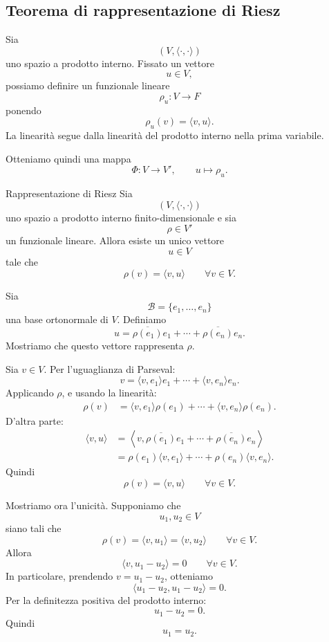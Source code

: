 \documentclass[a4paper]{article}
\begin{document}
\subsection{Teorema di rappresentazione di Riesz}

Sia
\[
    (V,\langle\cdot,\cdot\rangle)
\]
uno spazio a prodotto interno. Fissato un vettore
\[
    u\in V,
\]
possiamo definire un funzionale lineare
\[
    \rho_u:V\to F
\]
ponendo
\[
    \rho_u(v)=\langle v,u\rangle.
\]
La linearità segue dalla linearità del prodotto interno nella prima variabile.

Otteniamo quindi una mappa
\[
    \Phi:V\to V',
    \qquad
    u\mapsto \rho_u.
\]

\begin{snippettheorem}{Rappresentazione di Riesz}
    Sia
    \[
        (V,\langle\cdot,\cdot\rangle)
    \]
    uno spazio a prodotto interno finito-dimensionale e sia
    \[
        \rho\in V'
    \]
    un funzionale lineare. Allora esiste un unico vettore
    \[
        u\in V
    \]
    tale che
    \[
        \rho(v)=\langle v,u\rangle
        \qquad
        \forall v\in V.
    \]
\end{snippettheorem}

\begin{snippetproof}{}
    Sia
    \[
        \mathcal{B}=\{e_1,\ldots,e_n\}
    \]
    una base ortonormale di \(V\). Definiamo
    \[
        u=
        \overline{\rho(e_1)}e_1+\cdots+\overline{\rho(e_n)}e_n.
    \]
    Mostriamo che questo vettore rappresenta \(\rho\).

    Sia \(v\in V\). Per l'uguaglianza di Parseval:
    \[
        v=
        \langle v,e_1\rangle e_1+\cdots+\langle v,e_n\rangle e_n.
    \]
    Applicando \(\rho\), e usando la linearità:
    \begin{align*}
        \rho(v)
        &=
        \langle v,e_1\rangle\rho(e_1)
        +\cdots+
        \langle v,e_n\rangle\rho(e_n).
    \end{align*}
    D'altra parte:
    \begin{align*}
        \langle v,u\rangle
        &=
        \left\langle
        v,
        \overline{\rho(e_1)}e_1+\cdots+\overline{\rho(e_n)}e_n
        \right\rangle\\
        &=
        \rho(e_1)\langle v,e_1\rangle+\cdots+\rho(e_n)\langle v,e_n\rangle.
    \end{align*}
    Quindi
    \[
        \rho(v)=\langle v,u\rangle
        \qquad
        \forall v\in V.
    \]

    Mostriamo ora l'unicità. Supponiamo che
    \[
        u_1,u_2\in V
    \]
    siano tali che
    \[
        \rho(v)=\langle v,u_1\rangle=\langle v,u_2\rangle
        \qquad
        \forall v\in V.
    \]
    Allora
    \[
        \langle v,u_1-u_2\rangle=0
        \qquad
        \forall v\in V.
    \]
    In particolare, prendendo \(v=u_1-u_2\), otteniamo
    \[
        \langle u_1-u_2,u_1-u_2\rangle=0.
    \]
    Per la definitezza positiva del prodotto interno:
    \[
        u_1-u_2=0.
    \]
    Quindi
    \[
        u_1=u_2.
    \]
\end{snippetproof}
\end{document}
